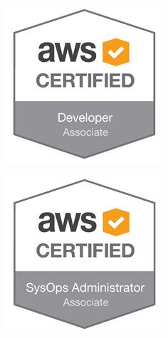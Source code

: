 \documentclass[]{cv-a4}
\begin{document}
\begin{figure}[h!]
  \centering
  \begin{subfigure}[b]{0.2\linewidth}
    \includegraphics[width=\linewidth]{images/DVA.png}
  \end{subfigure}
  \begin{subfigure}[b]{0.2\linewidth}
    \includegraphics[width=\linewidth]{images/SOA.png}

\end{subfigure}
\end{figure}
\end{document}
